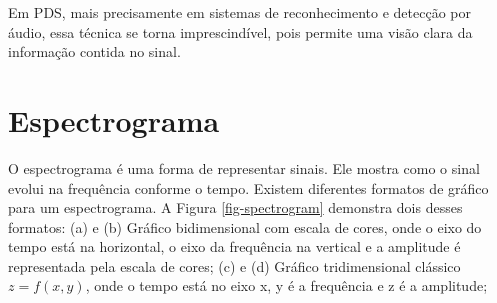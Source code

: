 Em PDS, mais precisamente em sistemas de reconhecimento e detecção por áudio, essa técnica se torna imprescindível, pois permite uma visão clara da informação contida no sinal. 

\section{Espectrograma}

O espectrograma é uma forma de representar sinais. Ele mostra como o sinal evolui na frequência conforme o tempo. Existem diferentes formatos de gráfico para um espectrograma. A Figura \ref{fig-spectrogram} demonstra dois desses formatos: (a) e (b) Gráfico bidimensional com escala de cores, onde o eixo do tempo está na horizontal, o eixo da frequência na vertical e a amplitude é representada pela escala de cores; (c) e (d) Gráfico tridimensional clássico $z = f(x,y)$, onde o tempo está no eixo x, y é a frequência e z é a amplitude;


